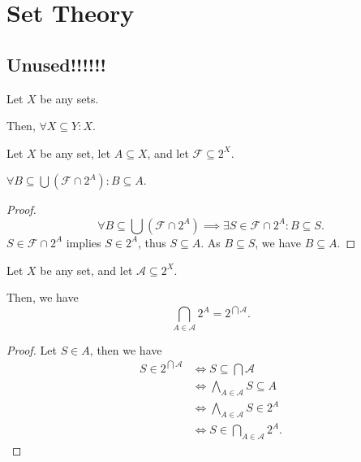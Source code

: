 
\chapter{Set Theory}



\section{Unused!!!!!!}


\begin{lemma}
	\label{power set of subset}
	
	Let $X$ be any sets.
	
	Then, $\forall X \subseteq Y: X$.
\end{lemma}


\begin{lemma}
	\label{lm: subset of the union of a family and powerset}

	Let $X$ be any set, let $A \subseteq X$, and let $\mathcal F \subseteq 2^X$.
	
	$\forall B \subseteq \bigcup( \mathcal F \cap 2^A): B \subseteq A$.
	
	\begin{proof}
		$$
		\forall B \subseteq \bigcup( \mathcal F \cap 2^A) \implies \exists S \in \mathcal F \cap 2^A: B \subseteq S.
		$$
		$S \in \mathcal F \cap 2^A$ implies $S \in 2^A$, thus $S \subseteq A$. As $B \subseteq S$, we have $B \subseteq A$.
	\end{proof}
\end{lemma}


\begin{lemma}
	\label{lm: intersection of power sets}
	
	Let $X$ be any set, and let $\mathcal A \subseteq 2^X$.
	
	Then, we have
	$$
	\bigcap_{A \in \mathcal A} 2^A = 2^{\bigcap \mathcal A}.
	$$
	
	\begin{proof}
		Let $S \in A$, then we have
		$$
		\begin{aligned}
			S \in 2^{\bigcap \mathcal A} &\iff S \subseteq \bigcap \mathcal A \\
			&\iff \bigwedge_{A \in \mathcal A} S \subseteq A \\
			&\iff \bigwedge_{A \in \mathcal A} S \in 2^A \\
			&\iff S \in \bigcap_{A \in \mathcal A} 2^A.
		\end{aligned}
		$$
	\end{proof}
\end{lemma}


